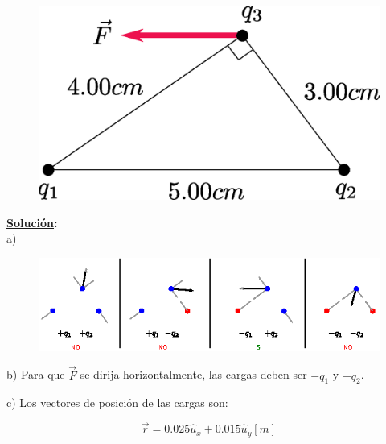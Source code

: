 \documentclass[letter,11pt]{article}
\begin{document}
\begin{figure}[!h]
\centering
\includegraphics[scale=0.34]{resources/f3.eps}
\end{figure}

\vspace{0.5cm}
\textbf{\underline{Solución}:} \\

a)
\begin{figure}[!h]
\centering
\includegraphics[scale=1.90]{resources/f3.1.eps}
\end{figure}

b)
Para que $\vec{F}$ se dirija horizontalmente, las cargas deben ser $-q_1$ y
$+q_2$.

c)
Los vectores de posición de las cargas son:

\begin{equation*}
    \vec{r} = 0.025 \hat{u}_x + 0.015 \hat{u}_y [m]
\end{equation*}
\end{document}

